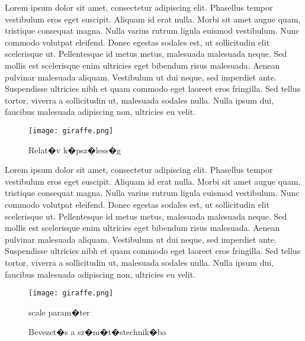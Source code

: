 \documentclass{article}
\begin{document}
Lorem ipsum dolor sit amet, consectetur adipiscing elit. Phasellus tempor vestibulum eros eget suscipit. Aliquam id erat nulla. Morbi sit amet augue quam, tristique consequat magna. Nulla varius rutrum ligula euismod vestibulum. Nunc commodo volutpat eleifend. Donec egestas sodales est, ut sollicitudin elit scelerisque ut. Pellentesque id metus metus, malesuada malesuada neque. Sed mollis est scelerisque enim ultricies eget bibendum risus malesuada. Aenean pulvinar malesuada aliquam. Vestibulum ut dui neque, sed imperdiet ante. Suspendisse ultricies nibh et quam commodo eget laoreet eros fringilla. Sed tellus tortor, viverra a sollicitudin ut, malesuada sodales nulla. Nulla ipsum dui, faucibus malesuada adipiscing non, ultricies eu velit.
\begin{figure}[h]
\centering
\texttt{[image: giraffe.png]}
\caption{Relat�v k�psz�less�g}
\label{fig:}
\end{figure}

Lorem ipsum dolor sit amet, consectetur adipiscing elit. Phasellus tempor vestibulum eros eget suscipit. Aliquam id erat nulla. Morbi sit amet augue quam, tristique consequat magna. Nulla varius rutrum ligula euismod vestibulum. Nunc commodo volutpat eleifend. Donec egestas sodales est, ut sollicitudin elit scelerisque ut. Pellentesque id metus metus, malesuada malesuada neque. Sed mollis est scelerisque enim ultricies eget bibendum risus malesuada. Aenean pulvinar malesuada aliquam. Vestibulum ut dui neque, sed imperdiet ante. Suspendisse ultricies nibh et quam commodo eget laoreet eros fringilla. Sed tellus tortor, viverra a sollicitudin ut, malesuada sodales nulla. Nulla ipsum dui, faucibus malesuada adipiscing non, ultricies eu velit.

\begin{figure}[h]
\centering
\texttt{[image: giraffe.png]}
\caption{scale param�ter}
\label{fig:}
\end{figure}


\begin{figure}
  \centering
  \caption{Bevezet�s a sz�m�t�stechnik�ba}
  \label{fig:animals}
\end{figure}
\end{document}
